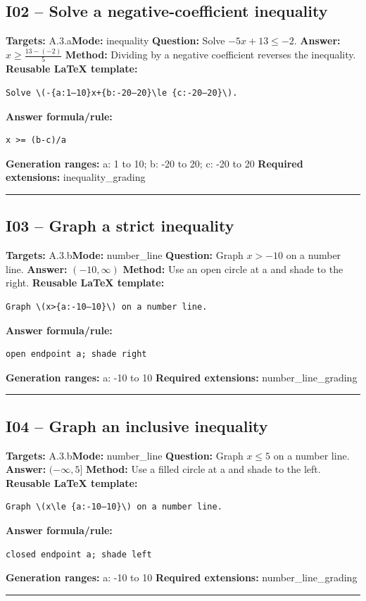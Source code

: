 \documentclass[11pt]{article}
\begin{document}
\subsection{I02 -- Solve a negative-coefficient inequality}
\textbf{Targets:} A.3.a\quad\textbf{Mode:} inequality
\textbf{Question:} Solve \(-5x+13\le -2\).
\textbf{Answer:} \(x\ge\frac{13-(-2)}{5}\)
\textbf{Method:} Dividing by a negative coefficient reverses the inequality.
\textbf{Reusable LaTeX template:}
\begin{verbatim}
Solve \(-{a:1–10}x+{b:-20–20}\le {c:-20–20}\).
\end{verbatim}
\textbf{Answer formula/rule:}
\begin{verbatim}
x >= (b-c)/a
\end{verbatim}
\textbf{Generation ranges:} a: 1 to 10; b: -20 to 20; c: -20 to 20
\textbf{Required extensions:} inequality\_grading
\medskip\hrule\medskip
\subsection{I03 -- Graph a strict inequality}
\textbf{Targets:} A.3.b\quad\textbf{Mode:} number\_line
\textbf{Question:} Graph \(x>-10\) on a number line.
\textbf{Answer:} \((-10,\infty)\)
\textbf{Method:} Use an open circle at a and shade to the right.
\textbf{Reusable LaTeX template:}
\begin{verbatim}
Graph \(x>{a:-10–10}\) on a number line.
\end{verbatim}
\textbf{Answer formula/rule:}
\begin{verbatim}
open endpoint a; shade right
\end{verbatim}
\textbf{Generation ranges:} a: -10 to 10
\textbf{Required extensions:} number\_line\_grading
\medskip\hrule\medskip
\subsection{I04 -- Graph an inclusive inequality}
\textbf{Targets:} A.3.b\quad\textbf{Mode:} number\_line
\textbf{Question:} Graph \(x\le 5\) on a number line.
\textbf{Answer:} \((-\infty,5]\)
\textbf{Method:} Use a filled circle at a and shade to the left.
\textbf{Reusable LaTeX template:}
\begin{verbatim}
Graph \(x\le {a:-10–10}\) on a number line.
\end{verbatim}
\textbf{Answer formula/rule:}
\begin{verbatim}
closed endpoint a; shade left
\end{verbatim}
\textbf{Generation ranges:} a: -10 to 10
\textbf{Required extensions:} number\_line\_grading
\medskip\hrule\medskip
\end{document}
